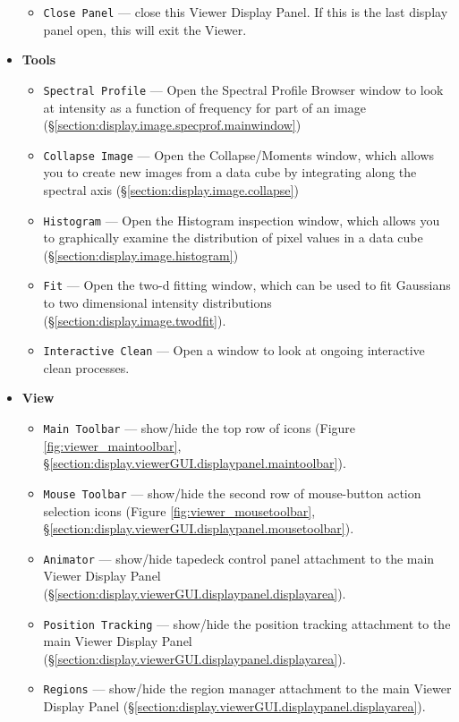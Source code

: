 \begin{itemize}
\begin{itemize}
      \item {\tt Close Panel} --- close this Viewer Display Panel. If this is the last display
      panel open, this will exit the Viewer.
  \end{itemize}
\item {\bf Tools}
  \begin{itemize}
      \item {\tt Spectral Profile} --- Open the Spectral Profile Browser window to look at intensity as a function of frequency for part of an image (\S \ref{section:display.image.specprof.mainwindow})
       \item {\tt Collapse Image} --- Open the Collapse/Moments window, which allows you to create new images from a data cube by integrating along the spectral axis (\S \ref{section:display.image.collapse})
       \item {\tt Histogram} --- Open the Histogram inspection window, which allows you to graphically examine the distribution of pixel values in a data cube (\S \ref{section:display.image.histogram})
       \item {\tt Fit} --- Open the two-d fitting window, which can be used to fit Gaussians to two dimensional intensity distributions (\S \ref{section:display.image.twodfit}).
       \item {\tt Interactive Clean} --- Open a window to look at ongoing interactive clean processes.
  \end{itemize}
\item {\bf View}
  \begin{itemize}
      \item {\tt Main Toolbar} --- show/hide the top row of icons (Figure \ref{fig:viewer_maintoolbar}, \S \ref{section:display.viewerGUI.displaypanel.maintoolbar}).      
      \item {\tt Mouse Toolbar} --- show/hide the second row of mouse-button action selection icons (Figure \ref{fig:viewer_mousetoolbar}, \S \ref{section:display.viewerGUI.displaypanel.mousetoolbar}).
      \item {\tt Animator} --- show/hide tapedeck control panel attachment to the main Viewer Display Panel (\S \ref{section:display.viewerGUI.displaypanel.displayarea}).
      \item {\tt Position Tracking} --- show/hide the position tracking attachment to the main Viewer Display Panel (\S \ref{section:display.viewerGUI.displaypanel.displayarea}).
      \item {\tt Regions} --- show/hide the region manager attachment to the main Viewer Display Panel (\S \ref{section:display.viewerGUI.displaypanel.displayarea}).
  \end{itemize}
\end{itemize}


